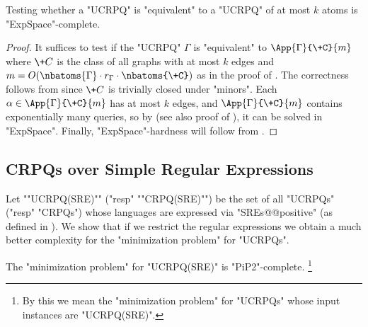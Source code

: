 \begin{corollary}
	\AP\label{coro:upperbound-ucrpqs}
	Testing whether a "UCRPQ" is "equivalent" to a "UCRPQ" of at most $k$ atoms is "ExpSpace"-complete.
\end{corollary}

\begin{proof}
	It suffices to test if the "UCRPQ" $\Gamma$ is "equivalent"
	to $\App{\Gamma}{\+C}{m}$ where $\+C$ is the class of all graphs
	with at most $k$ edges and $m=O(\nbatoms{\Gamma}\cdot r_{\Gamma} \cdot \nbatoms{\+C})$ as in the proof of . 
	The correctness follows from  since $\+C$ is
	trivially closed under "minors".
	Each $\alpha \in \App{\Gamma}{\+C}{m}$ has at most $k$ edges,
	and $\App{\Gamma}{\+C}{m}$ contains exponentially many queries,
	so by \cite[Proposition 3.11]{FigueiraMorvan2025SemanticTreeWidthLMCS} (see also proof of ), it can be solved
	in "ExpSpace".
	Finally, "ExpSpace"-hardness will follow from .
\end{proof}

\subsection{CRPQs over Simple Regular Expressions}

\AP Let ""UCRPQ(SRE)"" ("resp" ""CRPQ(SRE)"") be the set of all "UCRPQs" ("resp" "CRPQs") whose languages are expressed via "SREs@@positive" (as defined in ). We show that if we restrict the regular expressions we obtain a much better complexity for the "minimization problem" for "UCRPQs".

\begin{theorem}\AP\label{thm:minimization-SRE}
	The "minimization problem" for "UCRPQ(SRE)" is "PiP2"-complete.%
	\footnote{By this we mean the "minimization problem" for "UCRPQs" whose input instances are "UCRPQ(SRE)".}
\end{theorem}

